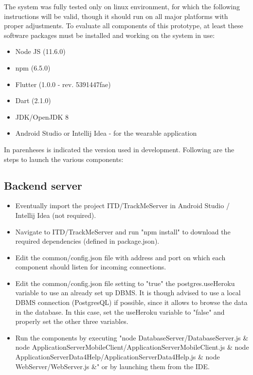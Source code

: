 \documentclass[../main.tex]{subfiles}
\begin{document}
The system was fully tested only on linux environment, for which the following instructions will be valid, though it should run on all major platforms with proper adjustments. To evaluate all components of this prototype, at least these software packages must be installed and working on the system in use:

\begin{itemize}
	\item Node JS (11.6.0)
	\item npm (6.5.0)
	\item Flutter (1.0.0 - rev. 5391447fae)
	\item Dart (2.1.0)
	\item JDK/OpenJDK 8
	\item Android Studio or Intellij Idea - for the wearable application
\end{itemize}

In parenheses is indicated the version used in development. Following are the steps to launch the various components:

\subsection{Backend server}

\begin{itemize}
	\item Eventually import the project ITD/TrackMeServer in Android Studio / Intellij Idea (not required).
	\item Navigate to ITD/TrackMeServer and run "npm install" to download the required dependencies (defined in package.json).
	\item Edit the common/config.json file with address and port on which each component should listen for incoming connections.
	\item Edit the common/config.json file setting to "true" the postgres.useHeroku variable to use an already set up DBMS. It is though advised to use a local DBMS connection (PostgresQL) if possible, since it allows to browse the data in the database. In this case, set the useHeroku variable to "false" and properly set the other three variables.
	\item Run the components by executing \newline "node DatabaseServer/DatabaseServer.js \& \newline node ApplicationServerMobileClient/ApplicationServerMobileClient.js \& \newline node ApplicationServerData4Help/ApplicationServerData4Help.js \& \newline node WebServer/WebServer.js \&" \newline or by launching them from the IDE.
\end{itemize}
\end{document}
